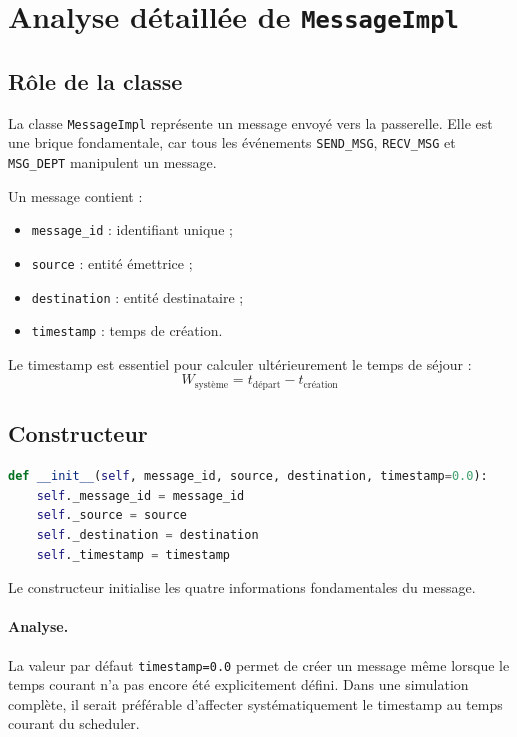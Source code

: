 \documentclass{article}
\begin{document}
\section{Analyse détaillée de \texttt{MessageImpl}}

\subsection{Rôle de la classe}

La classe \texttt{MessageImpl} représente un message envoyé vers la passerelle. Elle est une brique fondamentale, car tous les événements \texttt{SEND\_MSG}, \texttt{RECV\_MSG} et \texttt{MSG\_DEPT} manipulent un message.

Un message contient :
\begin{itemize}[leftmargin=*]
    \item \texttt{message\_id} : identifiant unique ;
    \item \texttt{source} : entité émettrice ;
    \item \texttt{destination} : entité destinataire ;
    \item \texttt{timestamp} : temps de création.
\end{itemize}

Le timestamp est essentiel pour calculer ultérieurement le temps de séjour :
\[
W_{\text{système}} = t_{\text{départ}} - t_{\text{création}}
\]

\subsection{Constructeur}

\begin{lstlisting}[language=Python, caption=Constructeur de MessageImpl]
def __init__(self, message_id, source, destination, timestamp=0.0):
    self._message_id = message_id
    self._source = source
    self._destination = destination
    self._timestamp = timestamp
\end{lstlisting}

Le constructeur initialise les quatre informations fondamentales du message.

\paragraph{Analyse.}
La valeur par défaut \texttt{timestamp=0.0} permet de créer un message même lorsque le temps courant n’a pas encore été explicitement défini. Dans une simulation complète, il serait préférable d’affecter systématiquement le timestamp au temps courant du scheduler.
\end{document}

